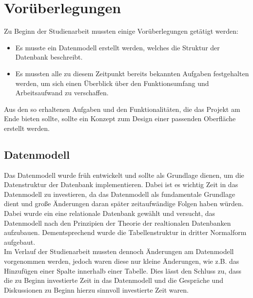 \chapter{Vorüberlegungen}
Zu Beginn der Studienarbeit mussten einige Vorüberlegungen getätigt werden:
\begin{itemize}
  \item Es musste ein Datenmodell erstellt werden, welches die Struktur der Datenbank beschreibt.
  \item Es mussten alle zu diesem Zeitpunkt bereits bekannten Aufgaben festgehalten werden, um sich
  einen Überblick über den Funktionsumfang und Arbeitsaufwand zu verschaffen.
\end{itemize}
Aus den so erhaltenen Aufgaben und den Funktionalitäten, die das Projekt am Ende bieten sollte, sollte ein Konzept zum Design einer passenden Oberfläche erstellt werden. 

\section{Datenmodell}
Das Datenmodell wurde früh entwickelt und sollte als Grundlage dienen, um die Datenstruktur der Datenbank implementieren. 
Dabei ist es wichtig Zeit in das Datenmodell zu investieren, da das Datenmodell als fundamentale Grundlage dient und große Änderungen daran später zeitaufwändige Folgen haben würden.
Dabei wurde ein eine relationale Datenbank gewählt und versucht, das Datenmodell nach den Prinzipien der Theorie der realtionalen Datenbanken aufzubauen.
Dementsprechend wurde die Tabellenstruktur in dritter Normalform aufgebaut.\\
Im Verlauf der Studienarbeit mussten dennoch Änderungen am Datenmodell vorgenommen werden, jedoch waren diese nur kleine Änderungen, wie z.B. das Hinzufügen einer Spalte innerhalb einer Tabelle.
Dies lässt den Schluss zu, dass die zu Beginn investierte Zeit in das Datenmodell und die Gespräche und Diskussionen zu Beginn hierzu sinnvoll investierte Zeit waren.

